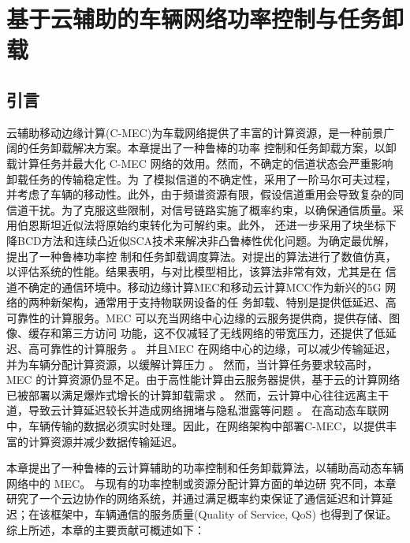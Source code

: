 \chapter{基于云辅助的车辆网络功率控制与任务卸载} \label{chap:table 第三章}  %

\section{引言}\label{section3-1}
云辅助移动边缘计算(C-MEC)为车载网络提供了丰富的计算资源，是一种前景广阔的任务卸载解决方案。本章提出了一种鲁棒的功率
控制和任务卸载方案，以卸载计算任务并最大化 C-MEC 网络的效用。然而，不确定的信道状态会严重影响卸载任务的传输稳定性。为
了模拟信道的不确定性，采用了一阶马尔可夫过程，并考虑了车辆的移动性。此外，由于频谱资源有限，假设信道重用会导致复杂的同
信道干扰。为了克服这些限制，对信号链路实施了概率约束，以确保通信质量。采用伯恩斯坦近似法将原始约束转化为可解约束。此外，
还进一步采用了块坐标下降BCD方法和连续凸近似SCA技术来解决非凸鲁棒性优化问题。为确定最优解，提出了一种鲁棒功率控
制和任务卸载调度算法。对提出的算法进行了数值仿真，以评估系统的性能。结果表明，与对比模型相比，该算法非常有效，尤其是在
信道不确定的通信环境中。移动边缘计算MEC和移动云计算MCC作为新兴的5G 网络的两种新架构，通常用于支持物联网设备的任
务卸载、特别是提供低延迟、高可靠性的计算服务。MEC 可以充当网络中心边缘的云服务提供商，提供存储、图像、缓存和第三方访问
功能，这不仅减轻了无线网络的带宽压力，还提供了低延迟、高可靠性的计算服务 \supercite{基于车辆边缘计算的任务卸载策略研究}。
并且MEC 在网络中心的边缘，可以减少传输延迟，并为车辆分配计算资源，以缓解计算压力 \supercite{CCO}。 然而，当计算任务要求较高时，
MEC 的计算资源仍显不足。由于高性能计算由云服务器提供，基于云的计算网络已被部署以满足爆炸式增长的计算卸载需求 \supercite{SurveyMEC2017,SurveyMEC2018,DistributedTask2024}。  %
然而，云计算中心往往远离主干道，导致云计算延迟较长并造成网络拥堵与隐私泄露等问题 \supercite{Qian2023, 曹宇慧车载边缘计算环境下任务协同卸载方法研究,云计算隐私10418975}。
在高动态车联网中，车辆传输的数据必须实时处理。因此，在网络架构中部署C-MEC，以提供丰富的计算资源并减少数据传输延迟。

本章提出了一种鲁棒的云计算辅助的功率控制和任务卸载算法，以辅助高动态车辆网络中的 MEC。 与现有的功率控制或资源分配计算方面的单边研
究不同，本章研究了一个云边协作的网络系统，并通过满足概率约束保证了通信延迟和计算延迟；在该框架中，车辆通信的服务质量(Quality of Service, QoS)
也得到了保证。 综上所述，本章的主要贡献可概述如下：

